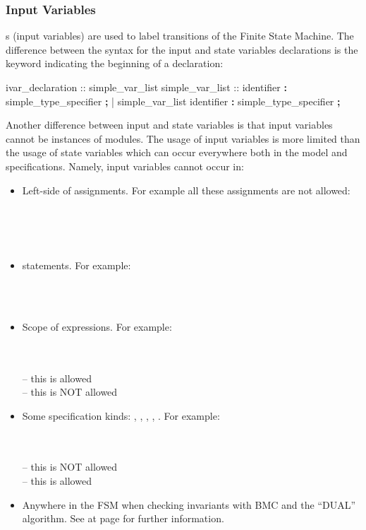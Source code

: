 \subsubsection{Input Variables}
\label{Input Variables}
%
s (input variables) are used to label transitions of the
Finite State Machine. The difference between the syntax for the input
and state variables declarations is the keyword indicating the
beginning of a declaration:
%
\begin{Grammar}
ivar_declaration ::  simple_var_list
simple_var_list ::
        identifier \textbf{:} simple_type_specifier \textbf{;}
      | simple_var_list identifier \textbf{:} simple_type_specifier \textbf{;}
\end{Grammar}
%
Another difference between input and state variables is that input
variables cannot be instances of modules.
%
The usage of input variables is more limited than the usage of state
variables which can occur everywhere both in the model and
specifications.
%
Namely, input variables cannot occur in:

\begin{itemize}
\item Left-side of assignments. For example all these assignments
  are not allowed:

  \\
  \\
  \\

\item {} statements. For example:

  \\
  \\

\item Scope of  expressions. For example:

  \\
  \\
   -- this is allowed\\
   -- this is NOT allowed

\item Some specification kinds: , ,
      , , . For example:

  \\
  \\
   -- this is NOT allowed\\
   -- this is allowed


\item Anywhere in the FSM when checking invariants with BMC and the
  ``DUAL'' algorithm. See at page \pageref{bmc::dual} for further
  information.

\end{itemize}


